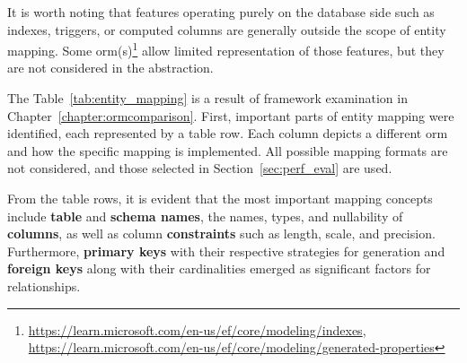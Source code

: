 It is worth noting that features operating purely on the database side such as indexes, triggers, or computed columns are generally outside the scope of entity mapping. Some \acrshort{orm}(s)\footnote{\url{https://learn.microsoft.com/en-us/ef/core/modeling/indexes}, \url{https://learn.microsoft.com/en-us/ef/core/modeling/generated-properties}} allow limited representation of those features, but they are not considered in the abstraction.

The Table~\ref{tab:entity_mapping} is a result of framework examination in Chapter~\ref{chapter:ormcomparison}. First, important parts of entity mapping were identified, each represented by a table row. Each column depicts a different \acrshort{orm} and how the specific mapping is implemented. All possible mapping formats are not considered, and those selected in Section~\ref{sec:perf_eval} are used. 

From the table rows, it is evident that the most important mapping concepts include \textbf{table} and \textbf{schema names}, the names, types, and nullability of \textbf{columns}, as well as column \textbf{constraints} such as length, scale, and precision. Furthermore, \textbf{primary keys} with their respective strategies for generation and \textbf{foreign keys} along with their cardinalities emerged as significant factors for relationships.

